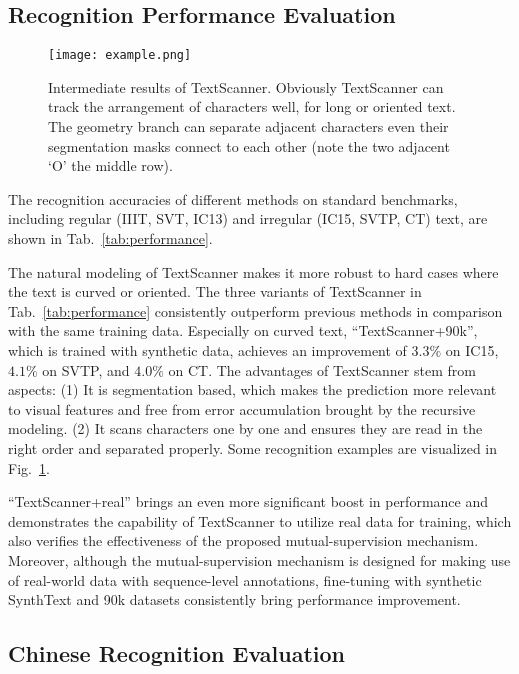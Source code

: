 \documentclass[letterpaper]{article} \usepackage{aaai20}  \usepackage{times}  \usepackage{helvet} \usepackage{courier}  \usepackage[hyphens]{url}  \usepackage{graphicx} \urlstyle{rm} \def\UrlFont{\rm}  \usepackage{graphicx}  \frenchspacing  \setlength{\pdfpagewidth}{8.5in}  \setlength{\pdfpageheight}{11in}
\begin{document}
\subsection{Recognition Performance Evaluation}

\begin{figure}[!ht]
\centering
\texttt{[image: example.png]}
\caption{Intermediate results of TextScanner. Obviously TextScanner can track the arrangement of characters well, for long or oriented text. The geometry branch can separate adjacent characters even their segmentation masks connect to each other (note the two adjacent `O' the middle row).}
\label{fig:example}
\end{figure}

The recognition accuracies of different methods on standard benchmarks, including regular (IIIT, SVT, IC13) and irregular  (IC15, SVTP, CT) text, are shown in Tab.~\ref{tab:performance}. 

The natural modeling of TextScanner makes it more robust to hard cases where the text is curved or oriented. The three variants of TextScanner in Tab.~\ref{tab:performance} consistently outperform previous methods in comparison with the same training data.
Especially on curved text, ``TextScanner+90k'', which is trained with synthetic data, achieves an improvement of $3.3\%$ on IC15, $4.1\%$ on SVTP, and $4.0\%$ on CT.
The advantages of TextScanner stem from aspects: (1) It is segmentation based, which makes the prediction more relevant to visual features and free from error accumulation brought by the recursive modeling. (2) It scans characters one by one and ensures they are read in the right order and separated properly. Some recognition examples are visualized in Fig.~\ref{fig:example}.


``TextScanner+real'' brings an even more significant boost in performance and demonstrates the capability of TextScanner to utilize real data for training, which also verifies the effectiveness of the proposed mutual-supervision mechanism. Moreover, although the mutual-supervision mechanism is designed for making use of real-world data with sequence-level annotations, fine-tuning with synthetic SynthText and 90k datasets consistently bring performance improvement.

\subsection{Chinese Recognition Evaluation}
\end{document}
